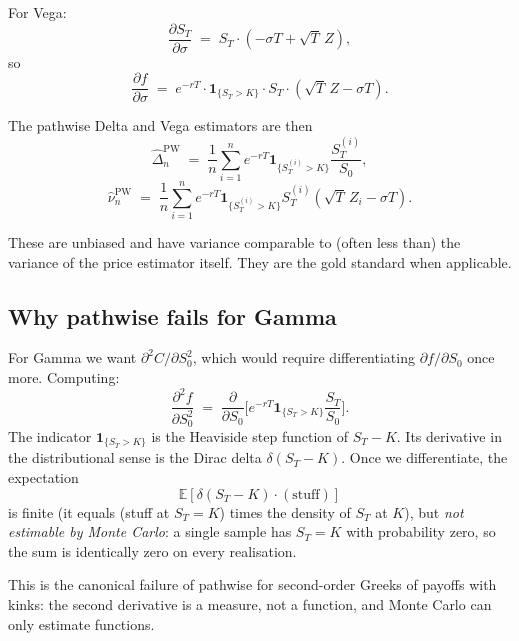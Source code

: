 \documentclass[11pt,a4paper]{article}
\theoremstyle{plain}
\theoremstyle{definition}
\theoremstyle{remark}
\newcommand{\E}{\mathbb{E}}
\newcommand{\indic}{\mathbf{1}}
\begin{document}
For Vega:
\begin{equation}
\frac{\partial S_T}{\partial \sigma}
\;=\; S_T \cdot (-\sigma T + \sqrt T \, Z),
\end{equation}
so
\begin{equation}
\frac{\partial f}{\partial \sigma}
\;=\; e^{-rT} \cdot \indic_{\{S_T > K\}} \cdot S_T \cdot (\sqrt T\, Z - \sigma T).
\end{equation}

The pathwise Delta and Vega estimators are then
\begin{equation}
\widehat{\Delta}_n^{\mathrm{PW}}
\;=\; \frac{1}{n} \sum_{i=1}^n e^{-rT} \indic_{\{S_T^{(i)} > K\}}
\frac{S_T^{(i)}}{S_0},
\end{equation}
\begin{equation}
\widehat{\nu}_n^{\mathrm{PW}}
\;=\; \frac{1}{n} \sum_{i=1}^n e^{-rT} \indic_{\{S_T^{(i)} > K\}}
S_T^{(i)} (\sqrt T\, Z_i - \sigma T).
\end{equation}

These are unbiased and have variance comparable to (often less
than) the variance of the price estimator itself. They are the
gold standard when applicable.

\subsection{Why pathwise fails for Gamma}

For Gamma we want $\partial^2 C / \partial S_0^2$, which would
require differentiating $\partial f/\partial S_0$ once more.
Computing:
\begin{equation}
\frac{\partial^2 f}{\partial S_0^2}
\;=\; \frac{\partial}{\partial S_0}\bigl[
e^{-rT} \indic_{\{S_T > K\}} \frac{S_T}{S_0}\bigr].
\end{equation}
The indicator $\indic_{\{S_T > K\}}$ is the Heaviside step
function of $S_T - K$. Its derivative in the distributional sense
is the Dirac delta $\delta(S_T - K)$. Once we differentiate, the
expectation
\begin{equation}
\E\!\left[\delta(S_T - K) \cdot (\text{stuff})\right]
\end{equation}
is finite (it equals (stuff at $S_T = K$) times the density of $S_T$
at $K$), but \emph{not estimable by Monte Carlo}: a single sample
has $S_T = K$ with probability zero, so the sum is identically zero
on every realisation.

This is the canonical failure of pathwise for second-order Greeks
of payoffs with kinks: the second derivative is a measure, not a
function, and Monte Carlo can only estimate functions.
\end{document}
